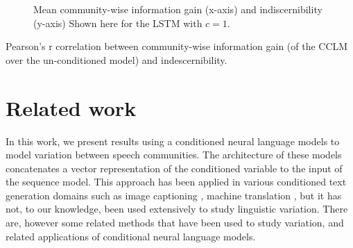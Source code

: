 \documentclass[11pt,a4paper]{article}
\begin{document}
\begin{figure}
  \caption{%
    Mean community-wise information gain (x-axis) 
    and indiscernibility (y-axis) 
    Shown here for the LSTM with $c = 1$.}
  \label{fig:cclm_lmcc_ppl}
\end{figure}

\begin{table}
  \centering
  \caption{
    Pearson's r correlation between community-wise information gain (of the CCLM over the un-conditioned model) and indescernibility.
  }
  \label{tab:lmcc_gain}
\end{table}





\section{Related work}

In this work, we present results using a conditioned neural language models
to model variation between speech communities.
The architecture of these models concatenates a vector representation
of the conditioned variable to the input of the sequence model.
This approach has been applied in various conditioned text generation domains such as 
image captioning \citep{Vinyals2015}, machine translation \citep{Kalchbrenner2013},
but it has not, to our knowledge, been used extensively to study linguistic variation.
There are, however some related methods that have been used to study variation,
and related applications of conditional neural language models.
\end{document}

